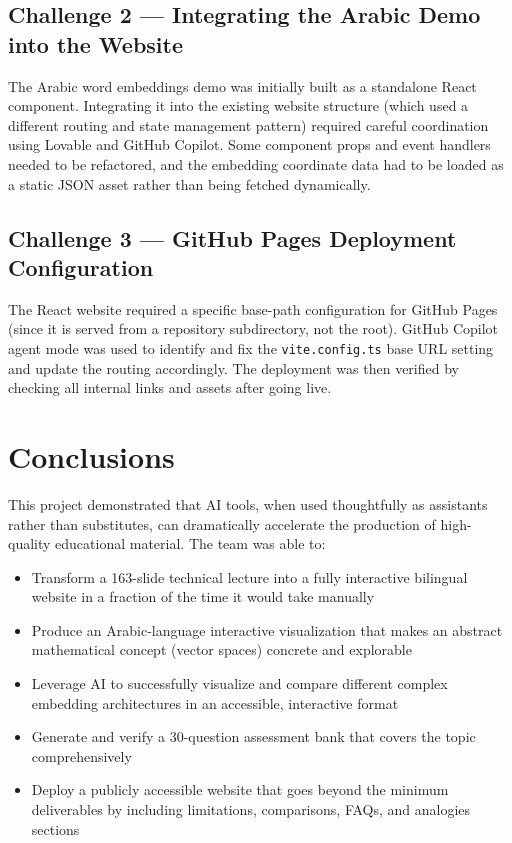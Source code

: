 \subsection{Challenge 2 — Integrating the Arabic Demo into the Website}
The Arabic word embeddings demo was initially built as a standalone React component. Integrating it into the existing website structure (which used a different routing and state management pattern) required careful coordination using Lovable and GitHub Copilot. Some component props and event handlers needed to be refactored, and the embedding coordinate data had to be loaded as a static JSON asset rather than being fetched dynamically.

\subsection{Challenge 3 — GitHub Pages Deployment Configuration}
The React website required a specific base-path configuration for GitHub Pages (since it is served from a repository subdirectory, not the root). GitHub Copilot agent mode was used to identify and fix the \texttt{vite.config.ts} base URL setting and update the routing accordingly. The deployment was then verified by checking all internal links and assets after going live.

\section{Conclusions}

This project demonstrated that AI tools, when used thoughtfully as assistants rather than substitutes, can dramatically accelerate the production of high-quality educational material. The team was able to:
\begin{itemize}
    \item Transform a 163-slide technical lecture into a fully interactive bilingual website in a fraction of the time it would take manually
    \item Produce an Arabic-language interactive visualization that makes an abstract mathematical concept (vector spaces) concrete and explorable
    \item Leverage AI to successfully visualize and compare different complex embedding architectures in an accessible, interactive format
    \item Generate and verify a 30-question assessment bank that covers the topic comprehensively
    \item Deploy a publicly accessible website that goes beyond the minimum deliverables by including limitations, comparisons, FAQs, and analogies sections
\end{itemize}

